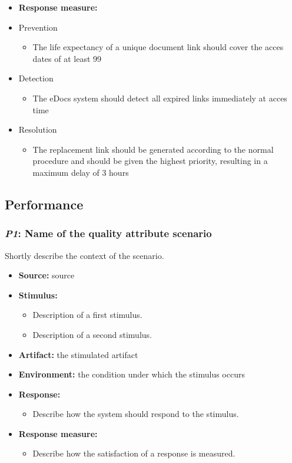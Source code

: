 \documentclass[a4paper,10pt]{article}
\begin{document}
\begin{itemize}
    \item \textbf{Response measure:}
            \item Prevention
		\begin{itemize}
			\item The life expectancy of a unique document link should cover the acces dates of at least 99%
		\end{itemize}
            \item Detection
		\begin{itemize}
			\item The eDocs system should detect all expired links immediately at acces time
		\end{itemize}
            \item Resolution
		\begin{itemize}
			\item The replacement link should be generated according to the normal procedure and should be given the highest priority, resulting in a maximum delay of 3 hours
		\end{itemize}
\end{itemize}

\subsection{Performance}
\subsubsection{\emph{P1}: Name of the quality attribute scenario}
Shortly describe the context of the scenario.

\begin{itemize}
    \item \textbf{Source:} source
    \item \textbf{Stimulus:}
        \begin{itemize}
            \item Description of a first stimulus.
            \item Description of a second stimulus.
        \end{itemize}

    \item \textbf{Artifact:} the stimulated artifact
    \item \textbf{Environment:} the condition under which the stimulus occurs
    \item \textbf{Response:}
        \begin{itemize}
            \item Describe how the system should respond to the stimulus.
        \end{itemize}

    \item \textbf{Response measure:}
        \begin{itemize}
            \item Describe how the satisfaction of a response is measured.
        \end{itemize}
\end{itemize}
\end{document}
